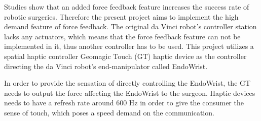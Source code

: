 Studies show that an added force feedback feature increases the success rate of robotic surgeries\cite{lack_fb}. Therefore the present project aims to implement the high demand feature of force feedback. The original da Vinci robot's controller station lacks any actuators, which means that the force feedback feature can not be implemented in it, thus another controller has to be used. This project utilizes a spatial haptic controller Geomagic Touch (GT) haptic device as the controller directing the da Vinci robot's end-manipulator called EndoWrist. 







In order to provide the sensation of directly controlling the EndoWrist, the GT needs to output the force affecting the EndoWrist to the surgeon. Haptic devices needs to have a refresh rate around 600 Hz in order to give the consumer the sense of touch\cite{coles2011role}, which poses a speed demand on the communication.%


